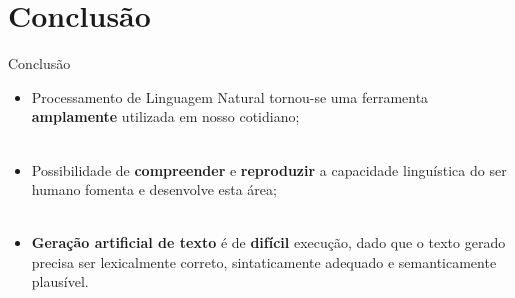 \section{Conclusão}
\label{s.conclusion}

\begin{frame}{Conclusão}
	\begin{itemize}
		\justifying
		\item Processamento de Linguagem Natural tornou-se uma ferramenta \textbf{amplamente} utilizada em nosso cotidiano;
		\\~\\
		\item Possibilidade de \textbf{compreender} e \textbf{reproduzir} a capacidade linguística do ser humano fomenta e desenvolve esta área;
		\\~\\
		\item \textbf{Geração artificial de texto} é de \textbf{difícil} execução, dado que o texto gerado precisa ser lexicalmente correto, sintaticamente adequado e semanticamente plausível.
	\end{itemize}
\end{frame}
